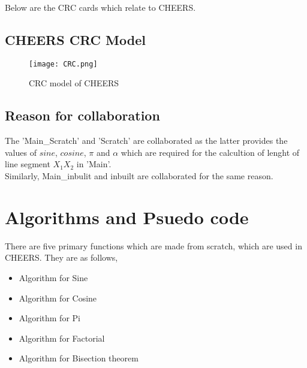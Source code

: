 \documentclass[11pt]{article}
\begin{document}
		Below are the CRC cards which relate to CHEERS. 
	
\newpage
	\subsection{CHEERS CRC Model}
		\begin{figure}[h!]
			\texttt{[image: CRC.png]} %
			\caption{CRC model of CHEERS}
		\end{figure}
	\subsection{Reason for collaboration}
		
		The 'Main\_Scratch' and 'Scratch' are collaborated as the latter provides the values of $sine$, $cosine$, $\pi$ and $\alpha$ which are required for the calcultion of lenght of line segment $X_1X_2$ in 'Main'.\\
		Similarly, Main\_inbulit and inbuilt are collaborated for the same reason.

\newpage
\section{Algorithms and Psuedo code}
	
	There are five primary functions which are made from scratch, which are used in CHEERS. They are as follows,
	
	\begin{itemize}
		\item Algorithm for Sine
		\item Algorithm for Cosine
	 	\item Algorithm for Pi
		\item Algorithm for Factorial
		\item Algorithm for Bisection theorem
	\end{itemize}
\end{document}
